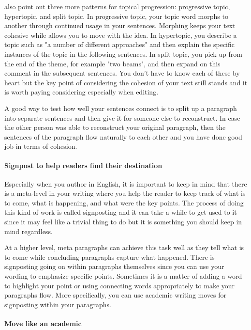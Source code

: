 \citet{aaltoFourPatterns} also point out three more patterns for topical progression: progressive topic, hypertopic, and split topic.
In progressive topic, your topic word morphs to another through continued usage in your sentences.
Morphing keeps your text cohesive while allows you to move with the idea.
In hypertopic, you describe a topic such as "a number of different approaches" and then explain the specific instances of the topic in the following sentences.
In split topic, you pick up from the end of the theme, for example "two beams", and then expand on this comment in the subsequent sentences.
You don't have to know each of these by heart but the key point of considering the cohesion of your text still stands and it is worth paying considering especially when editing.

A good way to test how well your sentences connect is to split up a paragraph into separate sentences and then give it for someone else to reconstruct.
In case the other person was able to reconstruct your original paragraph, then the sentences of the paragraph flow naturally to each other and you have done good job in terms of cohesion.

\paragraph{Signpost to help readers find their destination}

Especially when you author in English, it is important to keep in mind that there is a meta-level in your writing where you help the reader to keep track of what is to come, what is happening, and what were the key points.
The process of doing this kind of work is called signposting and it can take a while to get used to it since it may feel like a trivial thing to do but it is something you should keep in mind regardless.

At a higher level, meta paragraphs can achieve this task well as they tell what is to come while concluding paragraphs capture what happened.
There is signposting going on within paragraphs themselves since you can use your wording to emphasize specific points.
Sometimes it is a matter of adding a word to highlight your point or using connecting words appropriately to make your paragraphs flow.
More specifically, you can use academic writing moves for signposting within your paragraphs.

\paragraph{Move like an academic}

